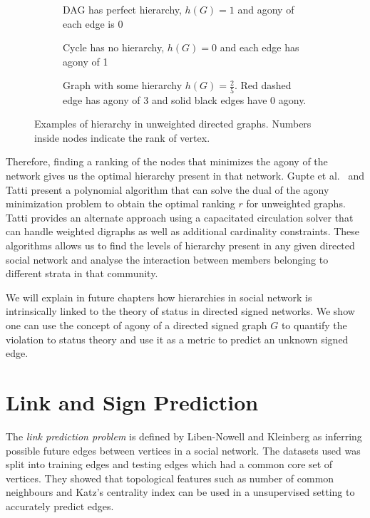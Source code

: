  
\begin{figure}[!ht]
    \centering
    \begin{subfigure}[t]{0.5\textwidth}
        \centering
        
        \caption{DAG has perfect hierarchy, $h(G)=1$ and agony of each edge is 0}
        \label{fig:dag}
    \end{subfigure}

    \begin{subfigure}[t]{0.49\textwidth}
        \centering
        
        \caption{Cycle has no hierarchy, $h(G)=0$ and each edge has agony of 1}
        \label{fig:cycle}
    \end{subfigure}
    \begin{subfigure}[t]{0.49\textwidth}
        \centering
        
        \caption{Graph with some hierarchy $h(G)=\frac{2}{5}$. Red dashed edge has agony of 3 and solid black edges have 0 agony.  }
        \label{fig:some-hierarchy}
    \end{subfigure}
    \caption{Examples of hierarchy in unweighted directed graphs. Numbers inside nodes indicate the rank of vertex.}
    \label{fig:hierarchy} 
\end{figure}

Therefore, finding a ranking of the nodes that minimizes the agony of the network gives us the optimal hierarchy present in that network. Gupte et al.\ \cite{gupte2011finding} and Tatti \cite{tatti2014faster} present a polynomial algorithm that can solve the dual of the agony minimization problem to obtain the optimal ranking $r$ for unweighted graphs. Tatti \cite{tatti2017tiers} provides an alternate approach using a capacitated circulation solver that can handle weighted digraphs as well as additional cardinality constraints. These algorithms allows us to find the levels of hierarchy present in any given directed social network and analyse the interaction between members belonging to different strata in that community.

We will explain in future chapters how hierarchies in social network is intrinsically linked to the theory of status in directed signed networks. We show one can use the concept of agony of a directed signed graph $G$ to quantify the violation to status theory and use it as a metric to predict an unknown signed edge.

\section{Link and Sign Prediction}
\label{sec:link-prediction}
The \textit{link prediction problem} is defined by Liben-Nowell and Kleinberg \cite{liben-nowell2007the} as inferring possible future edges between vertices in a social network. The datasets used was split into training edges and testing edges which had a common core set of vertices. They showed that topological features such as number of common neighbours and Katz's centrality index can be used in a unsupervised setting to accurately predict edges.

